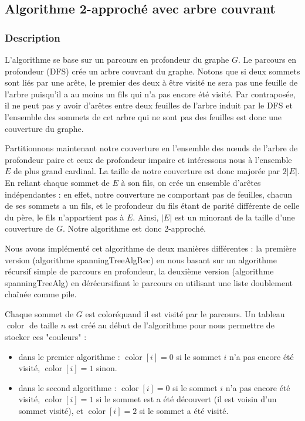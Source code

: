 \documentclass[a4paper,10pt]{article}
\DeclareMathOperator{\Color}{color}
\begin{document}

\subsection{Algorithme 2-approché avec arbre couvrant}

\subsubsection{Description}

L'algorithme se base sur un parcours en profondeur du graphe $G$. Le parcours en profondeur (DFS) crée un arbre couvrant du graphe. Notons que si deux sommets sont liés par une arête, le premier des deux à être visité ne sera pas une feuille de l'arbre puisqu'il a au moins un fils qui n'a pas encore été visité. Par contraposée, il ne peut pas y avoir d'arêtes entre deux feuilles de l'arbre induit par le DFS et l'ensemble des sommets de cet arbre qui ne sont pas des feuilles est donc une couverture du graphe. 

Partitionnons maintenant notre couverture en l'ensemble des nœuds de l'arbre de profondeur paire et ceux de profondeur impaire et intéressons nous à l'ensemble $E$ de plus grand cardinal. La taille de notre couverture est donc majorée par $2|E|$. En reliant chaque sommet de $E$ à son fils, on crée un ensemble d'arêtes indépendantes : en effet, notre couverture ne comportant pas de feuilles, chacun de ses sommets a un fils, et le profondeur du fils étant de parité différente de celle du père, le fils n'appartient pas à $E$. Ainsi, $|E|$ est un minorant de la taille d'une couverture de $G$. Notre algorithme est donc 2-approché.


Nous avons implémenté cet algorithme de deux manières différentes : la première version (algorithme \og spanningTreeAlgRec\fg) en nous basant sur un algorithme récursif simple de parcours en profondeur, la deuxième version (algorithme \og spanningTreeAlg\fg) en dérécursifiant le parcours en utilisant une liste doublement chaînée comme pile.

Chaque sommet de $G$ est \og coloré\fg quand il est visité par le parcours. Un tableau $\Color$ de taille $n$ est créé au début de l'algorithme pour nous permettre de stocker ces "couleurs" : 

\begin{itemize}
\item dans le premier algorithme : $\Color[i] = 0$ si le sommet $i$ n'a pas encore été visité, $\Color[i] = 1$ sinon.
\item dans le second algorithme : $\Color[i] = 0$ si le sommet $i$ n'a pas encore été visité, $\Color[i] = 1$ si le sommet est a été découvert (il est voisin d'un sommet visité), et $\Color[i] = 2$ si le sommet a été visité.
\end{itemize}
\end{document}
